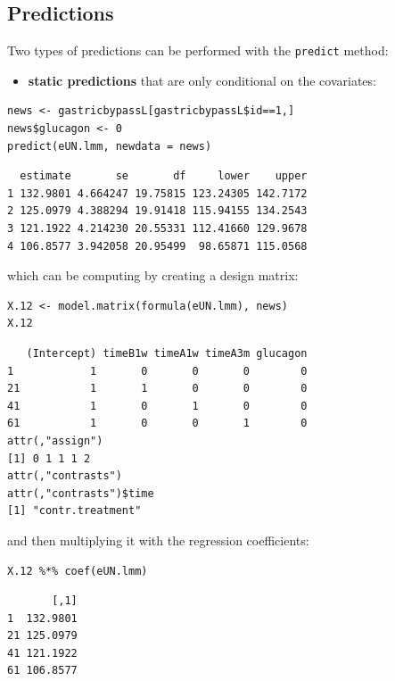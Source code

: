 \documentclass[12pt]{article}
\begin{document}
\subsection{Predictions}
\label{sec:orge688ba9}

Two types of predictions can be performed with the \texttt{predict} method:
\begin{itemize}
\item \textbf{static predictions} that are only conditional on the covariates:
\end{itemize}
\lstset{language=r,label= ,caption= ,captionpos=b,numbers=none}
\begin{lstlisting}
news <- gastricbypassL[gastricbypassL$id==1,]
news$glucagon <- 0
predict(eUN.lmm, newdata = news)
\end{lstlisting}

\begin{verbatim}
  estimate       se       df     lower    upper
1 132.9801 4.664247 19.75815 123.24305 142.7172
2 125.0979 4.388294 19.91418 115.94155 134.2543
3 121.1922 4.214230 20.55331 112.41660 129.9678
4 106.8577 3.942058 20.95499  98.65871 115.0568
\end{verbatim}


\clearpage

which can be computing by creating a design matrix:
\lstset{language=r,label= ,caption= ,captionpos=b,numbers=none}
\begin{lstlisting}
X.12 <- model.matrix(formula(eUN.lmm), news)
X.12
\end{lstlisting}

\begin{verbatim}
   (Intercept) timeB1w timeA1w timeA3m glucagon
1            1       0       0       0        0
21           1       1       0       0        0
41           1       0       1       0        0
61           1       0       0       1        0
attr(,"assign")
[1] 0 1 1 1 2
attr(,"contrasts")
attr(,"contrasts")$time
[1] "contr.treatment"
\end{verbatim}

and then multiplying it with the regression coefficients:
\lstset{language=r,label= ,caption= ,captionpos=b,numbers=none}
\begin{lstlisting}
X.12 %*% coef(eUN.lmm)
\end{lstlisting}

\begin{verbatim}
       [,1]
1  132.9801
21 125.0979
41 121.1922
61 106.8577
\end{verbatim}
\end{document}
